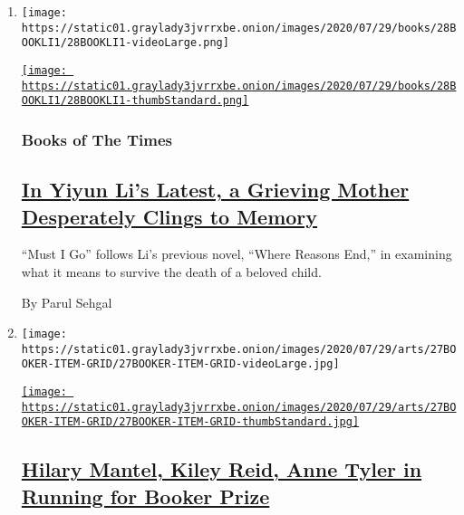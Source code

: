 \begin{enumerate}
\def\labelenumi{\arabic{enumi}.}
\item
  \texttt{[image: https://static01.graylady3jvrrxbe.onion/images/2020/07/29/books/28BOOKLI1/28BOOKLI1-videoLarge.png]}

  \href{/2020/07/28/books/review-must-i-go-yiyun-li.html}{\texttt{[image: https://static01.graylady3jvrrxbe.onion/images/2020/07/29/books/28BOOKLI1/28BOOKLI1-thumbStandard.png]}}

  \hypertarget{books-of-the-times}{%
  \subsubsection{Books of The Times}\label{books-of-the-times}}

  \hypertarget{in-yiyun-lis-latest-a-grieving-mother-desperately-clings-to-memory}{%
  \subsection{\texorpdfstring{\href{/2020/07/28/books/review-must-i-go-yiyun-li.html}{In
  Yiyun Li's Latest, a Grieving Mother Desperately Clings to
  Memory}}{In Yiyun Li's Latest, a Grieving Mother Desperately Clings to Memory}}\label{in-yiyun-lis-latest-a-grieving-mother-desperately-clings-to-memory}}

  ``Must I Go'' follows Li's previous novel, ``Where Reasons End,'' in
  examining what it means to survive the death of a beloved child.

  By Parul Sehgal
\item
  \texttt{[image: https://static01.graylady3jvrrxbe.onion/images/2020/07/29/arts/27BOOKER-ITEM-GRID/27BOOKER-ITEM-GRID-videoLarge.jpg]}

  \href{/2020/07/27/books/hilary-mantel-booker-prize-longlist.html}{\texttt{[image: https://static01.graylady3jvrrxbe.onion/images/2020/07/29/arts/27BOOKER-ITEM-GRID/27BOOKER-ITEM-GRID-thumbStandard.jpg]}}

  \hypertarget{hilary-mantel-kiley-reid-anne-tyler-in-running-for-booker-prize}{%
  \subsection{\texorpdfstring{\href{/2020/07/27/books/hilary-mantel-booker-prize-longlist.html}{Hilary
  Mantel, Kiley Reid, Anne Tyler in Running for Booker
  Prize}}{Hilary Mantel, Kiley Reid, Anne Tyler in Running for Booker Prize}}\label{hilary-mantel-kiley-reid-anne-tyler-in-running-for-booker-prize}}


\end{enumerate}
